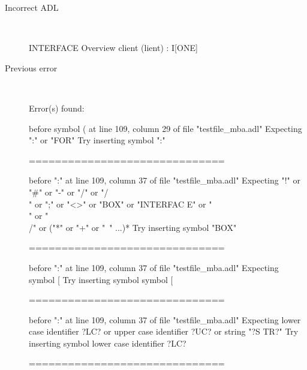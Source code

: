 \begin{description}
  \item[Incorrect ADL]~\\
\begin{adl}
INTERFACE Overview {client} (lient) : I[ONE]\end{adl}
  \item[Previous error]~\\
\begin{haskell}
Error(s) found:

before symbol ( at line 109, column 29 of file "testfile_mba.adl"
Expecting ":" or "FOR"
Try inserting symbol ":"

==============================

before ":" at line 109, column 37 of file "testfile_mba.adl"
Expecting "!" or "#" or "-" or "/" or "/\\" or ";" or "<>" or "BOX" or "INTERFAC
E" or "\\" or "\\/" or ("*" or "+" or "~" ...)*
Try inserting symbol "BOX"

==============================

before ":" at line 109, column 37 of file "testfile_mba.adl"
Expecting symbol [
Try inserting symbol symbol [

==============================

before ":" at line 109, column 37 of file "testfile_mba.adl"
Expecting lower case identifier ?LC? or upper case identifier ?UC? or string "?S
TR?"
Try inserting symbol lower case identifier ?LC?

==============================


\end{haskell}
\end{description}
